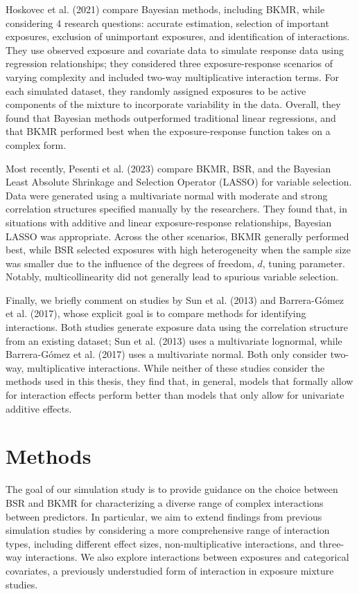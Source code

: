 \documentclass[12pt, twoside]{amherstthesis}
\begin{document}
Hoskovec et al. (2021) compare Bayesian methods, including BKMR, while considering 4 research questions: accurate estimation, selection of important exposures, exclusion of unimportant exposures, and identification of interactions. They use observed exposure and covariate data to simulate response data using regression relationships; they considered three exposure-response scenarios of varying complexity and included two-way multiplicative interaction terms. For each simulated dataset, they randomly assigned exposures to be active components of the mixture to incorporate variability in the data. Overall, they found that Bayesian methods outperformed traditional linear regressions, and that BKMR performed best when the exposure-response function takes on a complex form.

Most recently, Pesenti et al. (2023) compare BKMR, BSR, and the Bayesian Least Absolute Shrinkage and Selection Operator (LASSO) for variable selection. Data were generated using a multivariate normal with moderate and strong correlation structures specified manually by the researchers. They found that, in situations with additive and linear exposure-response relationships, Bayesian LASSO was appropriate. Across the other scenarios, BKMR generally performed best, while BSR selected exposures with high heterogeneity when the sample size was smaller due to the influence of the degrees of freedom, \(d\), tuning parameter. Notably, multicollinearity did not generally lead to spurious variable selection.

Finally, we briefly comment on studies by Sun et al. (2013) and Barrera-Gómez et al. (2017), whose explicit goal is to compare methods for identifying interactions. Both studies generate exposure data using the correlation structure from an existing dataset; Sun et al. (2013) uses a multivariate lognormal, while Barrera-Gómez et al. (2017) uses a multivariate normal. Both only consider two-way, multiplicative interactions. While neither of these studies consider the methods used in this thesis, they find that, in general, models that formally allow for interaction effects perform better than models that only allow for univariate additive effects.

\hypertarget{methods}{%
\section{Methods}\label{methods}}

The goal of our simulation study is to provide guidance on the choice between BSR and BKMR for characterizing a diverse range of complex interactions between predictors. In particular, we aim to extend findings from previous simulation studies by considering a more comprehensive range of interaction types, including different effect sizes, non-multiplicative interactions, and three-way interactions. We also explore interactions between exposures and categorical covariates, a previously understudied form of interaction in exposure mixture studies.
\end{document}
